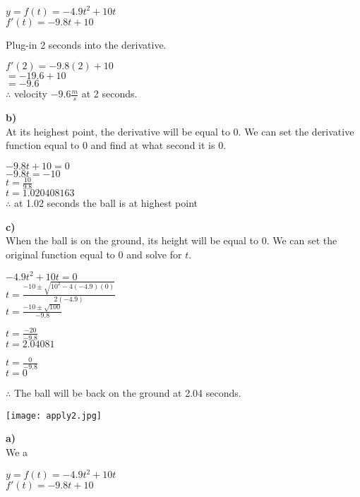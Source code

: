\documentclass[12pt,fleqn]{book} %
\begin{document}
\begin{center}
    {\large $y=f(t)=-4.9t^2+10t$} \\
    {\large $f'(t)=-9.8t + 10$}
\end{center}

\noindent Plug-in 2 seconds into the derivative.

\begin{center}
    {\large $f'(2)=-9.8(2)+10$} \\
    {\large $=-19.6+10$} \\
    {\large $=-9.6$} \\
    $\therefore$ velocity $-9.6\frac{m}{s}$ at 2 seconds.
\end{center}

\noindent \textbf{b)} \\
At its heighest point, the derivative will be equal to $0$. We can set the derivative function equal to 0 and find at what second it is 0.

\begin{center}
    {\large $-9.8t+10 =0$} \\
    {\large $-9.8t=-10$} \\
    {\large $t=\frac{10}{9.8}$} \\
    {\large $t=1.020408163$} \\
    $\therefore$ at 1.02 seconds the ball is at highest point
\end{center}

\noindent \textbf{c)} \\
When the ball is on the ground, its height will be equal to 0. We can set the original function equal to 0 and solve for $t$.

\begin{center}
    {\large $-4.9t^2+10t=0$} \\
    \vspace*{1mm}
    {\large $t=\frac{-10\pm\sqrt{10^2-4(-4.9)(0)}}{2(-4.9)}$} \\
    \vspace*{1mm}
    {\large $t=\frac{-10\pm\sqrt{100}}{-9.8}$}
    \begin{multicols}{2}
        {\large $t=\frac{-20}{-9.8}$} \\
        $t=2.04081$

        \columnbreak

        {\large $t=\frac{0}{-9.8}$} \\
        $t=0$
    \end{multicols}
\end{center}

\noindent $\therefore$ The ball will be back on the ground at 2.04 seconds.

\pagebreak

\texttt{[image: apply2.jpg]}

\noindent \textbf{a)} \\
We a

\begin{center}
    {\large $y=f(t)=-4.9t^2+10t$} \\
    {\large $f'(t)=-9.8t + 10$}
\end{center}
\end{document}
